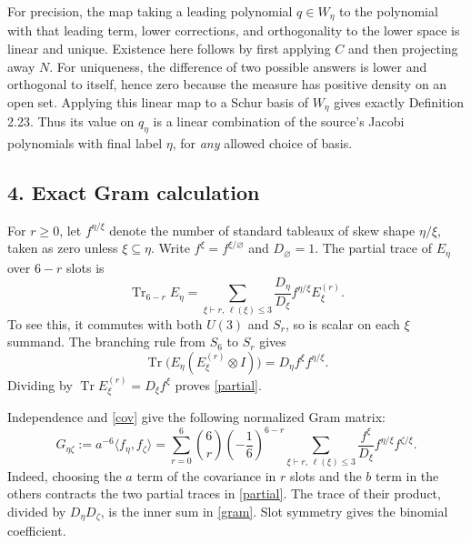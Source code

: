 \documentclass[11pt]{article}
\newcommand{\Tr}{\operatorname{Tr}}
\newcommand{\ip}[2]{\langle #1,#2\rangle}
\begin{document}
For precision, the map taking a leading polynomial $q\in W_\eta$
to the polynomial with that leading term, lower corrections, and
orthogonality to the lower space is linear and unique. Existence here
follows by first applying $C$ and then projecting away $N$.
For uniqueness, the difference of two possible answers is lower and
orthogonal to itself, hence zero because the measure has positive
density on an open set. Applying this linear map to a Schur basis of
$W_\eta$ gives exactly Definition 2.23. Thus its value on $q_\eta$
is a linear combination of the source's Jacobi polynomials with
final label $\eta$, for \emph{any} allowed choice of basis.

\subsection*{4. Exact Gram calculation}
For $r\ge0$, let $f^{\eta/\xi}$ denote the number of standard tableaux
of skew shape $\eta/\xi$, taken as zero unless $\xi\subseteq\eta$.
Write $f^\xi=f^{\xi/\varnothing}$ and $D_\varnothing=1$.
The partial trace of $E_\eta$ over $6-r$ slots is
\begin{equation}\label{partial}
 \Tr_{6-r}E_\eta
  =\sum_{\xi\vdash r,\,\ell(\xi)\le3}
       \frac{D_\eta}{D_\xi}f^{\eta/\xi}E_\xi^{(r)}.
\end{equation}
To see this, it commutes with both $U(3)$ and $S_r$, so is scalar
on each $\xi$ summand. The branching rule from $S_6$ to $S_r$ gives
\[
 \Tr\bigl(E_\eta(E_\xi^{(r)}\otimes I)\bigr)
       =D_\eta f^\xi f^{\eta/\xi}.
\]
Dividing by $\Tr E_\xi^{(r)}=D_\xi f^\xi$ proves \eqref{partial}.

Independence and \eqref{cov} give the following normalized Gram matrix:
\begin{equation}\label{gram}
 G_{\eta\zeta}:=a^{-6}\ip{f_\eta}{f_\zeta}
 =\sum_{r=0}^6\binom6r\left(-\frac16\right)^{6-r}
    \sum_{\xi\vdash r,\,\ell(\xi)\le3}
        \frac{f^\xi}{D_\xi}f^{\eta/\xi}f^{\zeta/\xi}.
\end{equation}
Indeed, choosing the $a$ term of the covariance in $r$ slots and the
$b$ term in the others contracts the two partial traces in
\eqref{partial}. The trace of their product, divided by
$D_\eta D_\zeta$, is the inner sum in \eqref{gram}.
Slot symmetry gives the binomial coefficient.
\end{document}

